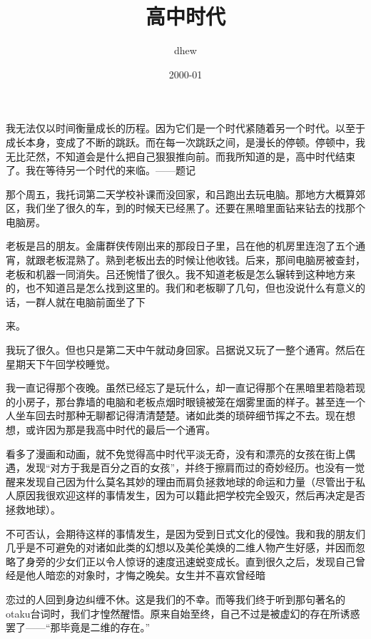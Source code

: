 \documentclass{article}
\title{高中时代}
\author{dhew}
\date{2000-01}
\begin{document}

\maketitle


\Large

﻿我无法仅以时间衡量成长的历程。因为它们是一个时代紧随着另一个时代。以至于成长本身，变成了不断的跳跃。而在每一次跳跃之间，是漫长的停顿。停顿中，我无比茫然，不知道会是什么把自己狠狠推向前。而我所知道的是，高中时代结束了。我在等待另一个时代的来临。——题记


那个周五，我托词第二天学校补课而没回家，和吕跑出去玩电脑。那地方大概算郊区，我们坐了很久的车，到的时候天已经黑了。还要在黑暗里面钻来钻去的找那个电脑房。

老板是吕的朋友。金庸群侠传刚出来的那段日子里，吕在他的机房里连泡了五个通宵，就跟老板混熟了。熟到老板出去的时候让他收钱。后来，那间电脑房被查封，老板和机器一同消失。吕还惋惜了很久。我不知道老板是怎么辗转到这种地方来的，也不知道吕是怎么找到这里的。我们和老板聊了几句，但也没说什么有意义的话，一群人就在电脑前面坐了下

\newpage 

来。

我玩了很久。但也只是第二天中午就动身回家。吕据说又玩了一整个通宵。然后在星期天下午回学校睡觉。

我一直记得那个夜晚。虽然已经忘了是玩什么，却一直记得那个在黑暗里若隐若现的小房子，那台靠墙的电脑和老板点烟时眼镜被笼在烟雾里面的样子。甚至连一个人坐车回去时那种无聊都记得清清楚楚。诸如此类的琐碎细节挥之不去。现在想想，或许因为那是我高中时代的最后一个通宵。


看多了漫画和动画，就不免觉得高中时代平淡无奇，没有和漂亮的女孩在街上偶遇，发现“对方于我是百分之百的女孩”，并终于擦肩而过的奇妙经历。也没有一觉醒来发现自己因为什么莫名其妙的理由而肩负拯救地球的命运和力量（尽管出于私人原因我很欢迎这样的事情发生，因为可以籍此把学校完全毁灭，然后再决定是否拯救地球）。

不可否认，会期待这样的事情发生，是因为受到日式文化的侵蚀。我和我的朋友们几乎是不可避免的对诸如此类的幻想以及美伦美焕的二维人物产生好感，并因而忽略了身旁的少女们正以令人惊讶的速度迅速蜕变成长。直到很久之后，发现自己曾经是他人暗恋的对象时，才悔之晚矣。女生并不喜欢曾经暗

\newpage 

恋过的人回到身边纠缠不休。这是我们的不幸。而等我们终于听到那句著名的otaku台词时，我们才惶然醒悟。原来自始至终，自己不过是被虚幻的存在所诱惑罢了——“那毕竟是二维的存在。”
\end{document}
